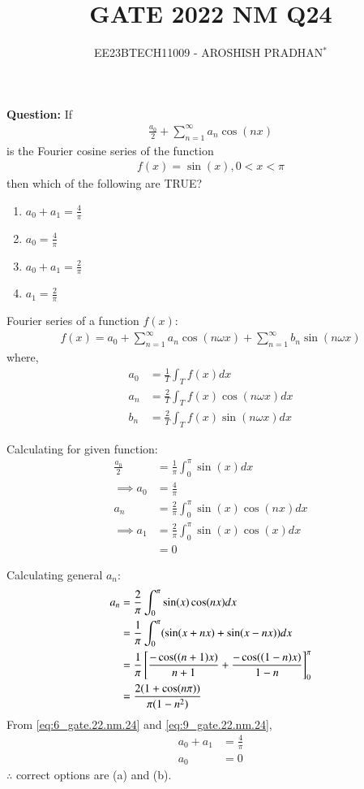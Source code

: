 \documentclass[journal,12pt,twocolumn]{IEEEtran}
\theoremstyle{remark}
\begin{document}

\vspace{3cm}

\title{GATE 2022 NM Q24}
\author{EE23BTECH11009 - AROSHISH PRADHAN$^{*}$%
}
\maketitle
\newpage
\bigskip
\textbf{Question:} If 
\begin{align}
    \frac{a_0}{2} + \sum_{n=1}^{\infty}a_n\cos(nx)\nonumber
\end{align}
is the Fourier cosine series of the function
\begin{align}
    f(x) = \sin(x), 0 < x < \pi \nonumber
\end{align}
then which of the following are TRUE?
\begin{enumerate}[label=(\alph*)]
    \item $a_0 + a_1 = \frac{4}{\pi}$
    \item $a_0 = \frac{4}{\pi}$
    \item $a_0 + a_1 = \frac{2}{\pi}$
    \item $a_1 = \frac{2}{\pi}$
\end{enumerate}
\solution


Fourier series of a function $f(x)$:
\begin{align}
    f(x) = a_0 + \sum_{n=1}^{\infty}a_n\cos(n\omega x) + \sum_{n=1}^{\infty}b_n\sin(n\omega x) 
\end{align}
where,
\begin{align}
    a_0 &= \frac{1}{T}\int_{T}f(x)dx\\
    a_n &= \frac{2}{T}\int_{T}f(x)\cos(n\omega x)dx\\
    b_n &= \frac{2}{T}\int_{T}f(x)\sin(n\omega x)dx
\end{align}

Calculating for given function:
\begin{align}
    \frac{a_0}{2} &= \frac{1}{\pi}\int_{0}^{\pi}\sin(x)dx\\
    \implies a_0 &= \frac{4}{\pi} \label{eq:6_gate.22.nm.24}\\
    a_n &= \frac{2}{\pi}\int_{0}^{\pi}\sin(x)\cos(nx)dx\\
    \implies a_1 &= \frac{2}{\pi}\int_{0}^{\pi}\sin(x)\cos(x)dx\\
    &= 0 \label{eq:9_gate.22.nm.24}
\end{align}

Calculating general $a_n$:
\begin{align}
    a_n &= \frac{2}{\pi}\int_{0}^{\pi}\sin(x)\cos(nx)dx\\
    &= \frac{1}{\pi}\int_{0}^{\pi}(\sin(x+nx) + \sin(x - nx))dx\\
    &= \frac{1}{\pi}{}\left[\frac{-\cos((n+1)x)}{n+1} + \frac{-\cos((1-n)x)}{1-n}\right]_{0}^{\pi}\\
    &= \frac{2(1 + \cos(n\pi))}{\pi(1 - n^2)}
\end{align}
From \eqref{eq:6_gate.22.nm.24} and \eqref{eq:9_gate.22.nm.24},
\begin{align}
    a_0 + a_1 &= \frac{4}{\pi}\\
    a_0 &= 0
\end{align}
$\therefore$ correct options are (a) and (b).
\end{document}
